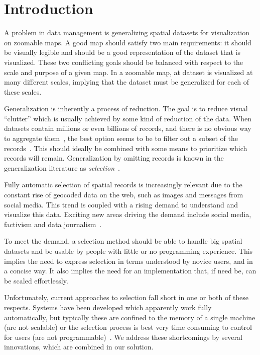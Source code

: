 \section{Introduction}
A problem in data management is generalizing spatial datasets for visualization on zoomable maps. A good map should satisfy two main requirements: it should be visually legible and should be a good representation of the dataset that is visualized. These two conflicting goals should be balanced with respect to the scale and purpose of a given map. In a zoomable map, at dataset is visualized at many different scales, implying that the dataset must be generalized for each of these scales. 

Generalization is inherently a process of reduction. The goal is to reduce visual ``clutter'' which is usually achieved by some kind of reduction of the data. When datasets contain millions or even billions of records, and there is no obvious way to aggregate them~\cite{haunert2006landcover}, the best option seems to be to filter out a subset of the records~\cite{sarma2012fusiontables}. This should ideally be combined with some means to prioritize which records will remain. Generalization by omitting records is known in the generalization literature as \emph{selection}~\cite{weibel1999generalising}.

Fully automatic selection of spatial records is increasingly relevant due to the constant rise of geocoded data on the web, such as images and messages from social media. This trend is coupled with a rising demand to understand and visualize this data. Exciting new areas driving the demand include social media, factivism and data journalism~\cite{cohen2011journalism}. 

To meet the demand, a selection method should be able to handle big spatial datasets and be usable by people with little or no programming experience. This implies the need to express selection in terms understood by novice users, and in a concise way. It also implies the need for an implementation that, if need be, can be scaled effortlessly.

Unfortunately, current approaches to selection fall short in one or both of these respects. Systems have been developed which apparently work fully automatically, but typically these are confined to the memory of a single machine (are not scalable) or the selection process is best very time consuming to control for users (are not programmable)~\cite{sarma2012fusiontables}. We address these shortcomings by several innovations, which are combined in our solution.

